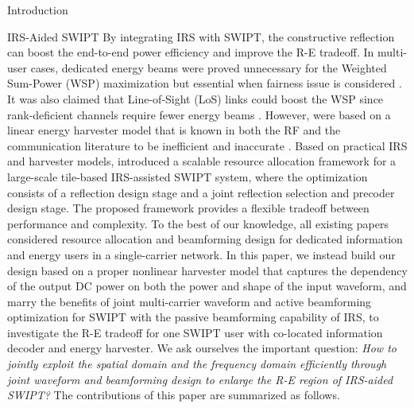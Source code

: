 \documentclass[journal,12pt,onecolumn,draftclsnofoot]{IEEEtran}
\begin{document}
\begin{section}{Introduction}
		\begin{subsection}{IRS-Aided SWIPT}
			By integrating IRS with SWIPT, the constructive reflection can boost the end-to-end power efficiency and improve the R-E tradeoff. In multi-user cases, dedicated energy beams were proved unnecessary for the Weighted Sum-Power (WSP) maximization \cite{Wu2020b} but essential when fairness issue is considered \cite{Tang2019}. It was also claimed that Line-of-Sight (LoS) links could boost the WSP since rank-deficient channels require fewer energy beams \cite{Wu2020a}. However, \cite{Wu2020b,Tang2019,Wu2020a} were based on a linear energy harvester model that is known in both the RF and the communication literature to be inefficient and inaccurate \cite{Clerckx2019,Trotter2009,Clerckx2018,Clerckx2016a,Kim2019,Kim2020a,Kim2021,Clerckx2017,Kim2017,Clerckx2018b,Varasteh2020,Varasteh2019d,Varasteh2020a}. Based on practical IRS and harvester models, \cite{Xu2021c} introduced a scalable resource allocation framework for a large-scale tile-based IRS-assisted SWIPT system, where the optimization consists of a reflection design stage and a joint reflection selection and precoder design stage. The proposed framework provides a flexible tradeoff between performance and complexity. To the best of our knowledge, all existing papers considered resource allocation and beamforming design for dedicated information and energy users in a single-carrier network. In this paper, we instead build our design based on a proper nonlinear harvester model that captures the dependency of the output DC power on both the power and shape of the input waveform, and marry the benefits of joint multi-carrier waveform and active beamforming optimization for SWIPT with the passive beamforming capability of IRS, to investigate the R-E tradeoff for one SWIPT user with co-located information decoder and energy harvester. We ask ourselves the important question: \emph{How to jointly exploit the spatial domain and the frequency domain efficiently through joint waveform and beamforming design to enlarge the R-E region of IRS-aided SWIPT?} The contributions of this paper are summarized as follows.


\end{subsection}
\end{section}
\end{document}
